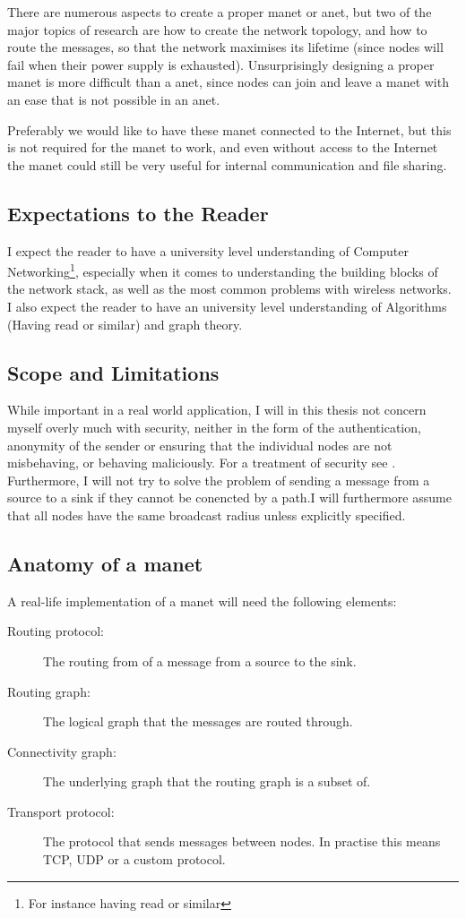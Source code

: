 There are numerous aspects to create a proper \ac{manet} or \ac{anet}, but two of the major topics of research are how to create the network topology, and how to route the messages, so that the network maximises its lifetime (since nodes will fail when their power supply is exhausted). Unsurprisingly designing a proper \ac{manet} is more difficult than a \ac{anet}, since nodes can join and leave a \ac{manet} with an ease that is not possible in an \ac{anet}. 

Preferably we would like to have these \ac{manet} connected to the Internet, but this is not required for the \ac{manet} to work, and even without access to the Internet the \ac{manet} could still be very useful for internal communication and file sharing. 
 

\subsection{Expectations to the Reader}
I expect the reader to have a university level understanding of Computer Networking\footnote{For instance having read \cite{ComNet} or similar}, especially when it comes to understanding the building blocks of the network stack, as well as the most common problems with wireless networks. I also expect the reader to have an university level understanding of Algorithms (Having read \cite{algo} or similar) and graph theory.

\subsection{Scope and Limitations}
While important in a real world application, I will in this thesis not concern myself overly much with security, neither in the form of the authentication, anonymity of the sender or ensuring that the individual nodes are not misbehaving, or behaving maliciously. For a treatment of security see \cite{trustedRouting}. Furthermore, I will not try to solve the problem of sending a message from a source to a sink if they cannot be conencted by a path.I will furthermore assume that all nodes have the same broadcast radius unless explicitly specified.

\subsection{Anatomy of a \ac{manet}}
A real-life implementation of a \ac{manet} will need the following elements:
\begin{description}
\item[Routing protocol:] The routing from of a message from a source to the sink.
\item[Routing graph:] The logical graph that the messages are routed through.
\item[Connectivity graph:] The underlying graph that the routing graph is a subset of.
\item[Transport protocol:] The protocol that sends messages between nodes. In practise this means TCP, UDP or a custom protocol.
\end{description}

